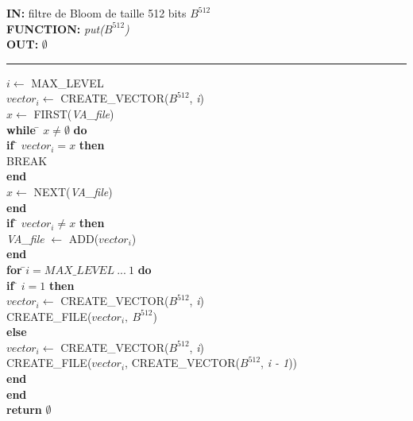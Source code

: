 \begin{flushleft}
	\begin{framed}
		\textbf{IN:} filtre de Bloom de taille 512 bits $B^{512}$\\
		\textbf{FUNCTION:} \textit{put($B^{512}$)}\\
		\textbf{OUT:} \textit{$\emptyset$}\\

		\noindent\rule{\linewidth}{0.5pt}

		\begin{tabbing}
			$i \leftarrow$ MAX\_LEVEL\\
			$vector_i \leftarrow$ CREATE\_VECTOR($B^{512}$, \textit{i})\\
			$x \leftarrow$ FIRST(\textit{VA\_file})\\
			\textbf{while }\= $x \neq \emptyset$ \textbf{do}\\
					\> \textbf{if }\= $vector_i = x$\textbf{ then}\\
					\> \> BREAK\\
					\> \textbf{end}\\
					\> $x \leftarrow$ NEXT(\textit{VA\_file})\\
			\textbf{end}	\\	
			
			\textbf{if }\= $vector_i \neq x$\textbf{ then}\\
				\> \textit{VA\_file } $\leftarrow$ ADD($vector_i$)\\
			\textbf{end}	\\	

			\textbf{for }\=$i = MAX\_LEVEL\ ...\ 1$ \textbf{do}\\
					\> \textbf{if }\= $i = 1$ \textbf{then}\\
					\> 	\> $vector_i \leftarrow$ CREATE\_VECTOR($B^{512}$, \textit{i})\\
					\>	\> CREATE\_FILE($vector_i,\ B^{512}$)\\
					\> \textbf{else}\\
					\>	\> $vector_i \leftarrow$ CREATE\_VECTOR($B^{512}$, \textit{i})\\
					\>	\> CREATE\_FILE($vector_i$, CREATE\_VECTOR($B^{512}$, \textit{i - 1}))\\
					\> \textbf{end}\\
			\textbf{end}	\\	
			\textbf{return} $\emptyset$\\
	    	\end{tabbing}		
	\end{framed}
\end{flushleft}

